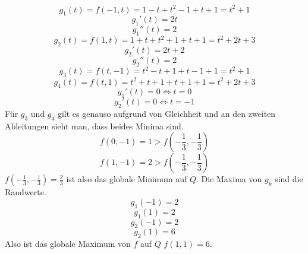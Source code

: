 \documentclass[10pt,a4paper]{article}
\begin{document}
\begin{equation}
g_{1}(t) = f(-1, t) = 1 - t + t^{2} - 1 + t + 1 = t^{2} + 1
\end{equation}
\begin{equation}
g_{1}'(t) = 2t
\end{equation}
\begin{equation}
g_{1}''(t) = 2
\end{equation}
\begin{equation}
g_{2}(t) = f(1, t) = 1 + t + t^{2} + 1 + t + 1 = t^{2} + 2t + 3
\end{equation}
\begin{equation}
g_{2}'(t) = 2t + 2
\end{equation}
\begin{equation}
g_{2}''(t) = 2
\end{equation}
\begin{equation}
g_{3}(t) = f(t, -1) = t^{2} - t + 1 + t - 1 + 1 = t^{2} + 1
\end{equation}
\begin{equation}
g_{4}(t) = f(t, 1) = t^{2} + t + 1 + t + 1 + 1 = t^{2} + 2t + 3
\end{equation}
\begin{equation}
g_{1}'(t) = 0 \Leftrightarrow t = 0
\end{equation}
\begin{equation}
g_{2}'(t) = 0 \Leftrightarrow t = -1
\end{equation}
Für $g_{3}$ und $g_{4}$ gilt es genauso aufgrund von Gleichheit und an den zweiten Ableitungen sieht man, dass beides Minima sind.
\begin{equation}
f(0, -1) = 1 > f(-\frac{1}{3}, -\frac{1}{3})
\end{equation}
\begin{equation}
f(1, -1) = 2 > f(-\frac{1}{3}, -\frac{1}{3})
\end{equation}
$f(-\frac{1}{3}, -\frac{1}{3}) = \frac{2}{3}$ ist also das globale Minimum auf $Q$.
Die Maxima von $g_{k}$ sind die Randwerte.
\begin{equation}
g_{1}(-1) = 2
\end{equation}
\begin{equation}
g_{1}(1) = 2
\end{equation}
\begin{equation}
g_{2}(-1) = 2
\end{equation}
\begin{equation}
g_{2}(1) = 6
\end{equation}
Also ist das globale Maximum von $f$ auf $Q$ $f(1, 1) = 6$.
\end{document}
